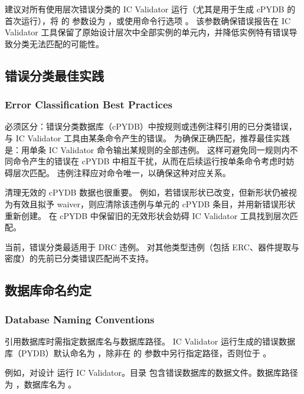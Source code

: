 \begin{noteBox}
建议对所有使用层次错误分类的 IC Validator 运行（尤其是用于生成 cPYDB 的首次运行），将  的  参数设为 ，或使用命令行选项 。
该参数确保错误报告在 IC Validator 工具保留了原始设计层次中全部实例的单元内，并降低实例特有错误导致分类无法匹配的可能性。
\end{noteBox}

\subsection{错误分类最佳实践}
\subsubsection*{Error Classification Best Practices}

必须区分：错误分类数据库（cPYDB）中按规则或违例注释引用的已分类错误，与 IC Validator 工具由某条命令产生的错误。
为确保正确匹配，推荐最佳实践是：用单条 IC Validator 命令输出某规则的全部违例。
这样可避免同一规则内不同命令产生的错误在 cPYDB 中相互干扰，从而在后续运行按单条命令考虑时妨碍层次匹配。
违例注释应对命令唯一，以确保这种对应关系。

清理无效的 cPYDB 数据也很重要。
例如，若错误形状已改变，但新形状仍被视为有效且拟予 waiver，则应清除该违例与单元的 cPYDB 条目，并用新错误形状重新创建。
在 cPYDB 中保留旧的无效形状会妨碍 IC Validator 工具找到层次匹配。

当前，错误分类最适用于 DRC 违例。
对其他类型违例（包括 ERC、器件提取与密度）的先前已分类错误匹配尚不支持。

\subsection{数据库命名约定}
\subsubsection*{Database Naming Conventions}

引用数据库时需指定数据库名与数据库路径。
IC Validator 运行生成的错误数据库（PYDB）默认命名为 ，除非在  的  参数中另行指定路径，否则位于 。

例如，对设计  运行 IC Validator。目录  包含错误数据库的数据文件。数据库路径为 ，数据库名为 。

